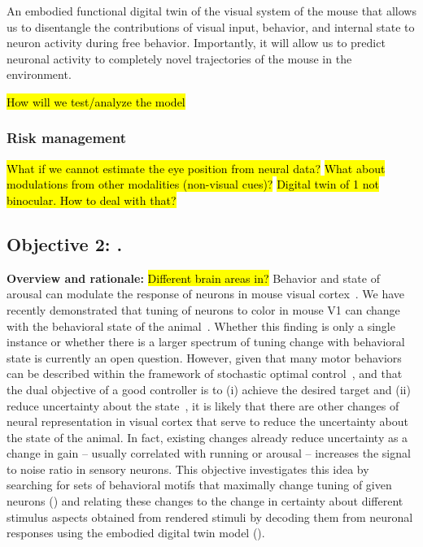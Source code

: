\documentclass[B2,COG]{ercgrant}
\begin{document}
An embodied functional digital twin of the visual system of the mouse that allows us to disentangle the contributions of visual input, behavior, and internal state to neuron activity during free behavior. 
Importantly, it will allow us to predict neuronal activity to completely novel trajectories of the mouse in the environment.

\hl{How will we test/analyze the model}

\subsubsection{Risk management} 
\hl{What if we cannot estimate the eye position from neural data?}
\hl{What about modulations from other modalities (non-visual cues)?}
\hl{Digital twin of 1 not binocular. How to deal with that?}

\subsection{\colorbox{obj2}{\color{white}Objective 2}: \otwotitle.}

\label{sub:obj2}

\textbf{Overview and rationale:} 
\hl{Different brain areas in?}
Behavior and state of arousal can modulate the response of neurons in mouse visual cortex~\parencite{Niell2010-bs, Stringer2019-lt, Musall2019-kd}.
We have recently demonstrated that tuning of neurons to color in mouse V1 can change with the behavioral state of the animal~\parencite{Franke2022-do}.
Whether this finding is only a single instance or whether there is a larger spectrum of tuning change with behavioral state is currently an open question. 
However, given that many motor behaviors can be described within the framework of stochastic optimal control~\parencite{Todorov2004-yb}, and that the dual objective of a good controller is to (i) achieve the desired target and (ii) reduce uncertainty about the state~\parencite{Patchell1971-zk}, it is likely that there are other changes of neural representation in visual cortex that serve to reduce the uncertainty about the state of the animal. 
In fact, existing changes already reduce uncertainty as a change in gain -- usually correlated with running or arousal -- increases the signal to noise ratio in sensory neurons. 
This objective investigates this idea by searching for sets of behavioral motifs that maximally change tuning of given neurons () and relating these changes to the change in certainty about different stimulus aspects obtained from rendered stimuli by decoding them from neuronal responses using the embodied digital twin model ().
\end{document}
